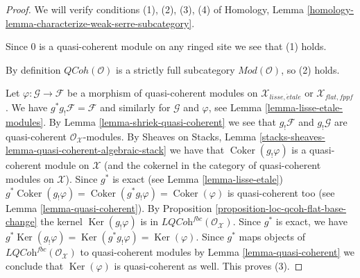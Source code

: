 \documentclass{stacks-project}
\theoremstyle{plain}
\theoremstyle{definition}
\theoremstyle{remark}
\numberwithin{equation}{subsection}
\def\etale{{\acute{e}tale}}
\def\QCoh{\mathit{QCoh}}
\def\Ker{\mathop{\mathrm{Ker}}}
\def\Coker{\mathop{\mathrm{Coker}}}
\begin{document}
\begin{proof}
We will verify conditions (1), (2), (3), (4) of
Homology, Lemma \ref{homology-lemma-characterize-weak-serre-subcategory}.

\medskip\noindent
Since $0$ is a quasi-coherent module on any ringed site we see that (1)
holds.

\medskip\noindent
By definition $\QCoh(\mathcal{O})$
is a strictly full subcategory $\textit{Mod}(\mathcal{O})$, so (2) holds.

\medskip\noindent
Let $\varphi : \mathcal{G} \to \mathcal{F}$ be a morphism of quasi-coherent
modules on $\mathcal{X}_{lisse,\etale}$ or $\mathcal{X}_{flat,fppf}$.
We have $g^*g_!\mathcal{F} = \mathcal{F}$ and similarly for
$\mathcal{G}$ and $\varphi$, see Lemma \ref{lemma-lisse-etale-modules}.
By Lemma \ref{lemma-shriek-quasi-coherent}
we see that $g_!\mathcal{F}$ and $g_!\mathcal{G}$ are quasi-coherent
$\mathcal{O}_\mathcal{X}$-modules. By Sheaves on Stacks, Lemma
\ref{stacks-sheaves-lemma-quasi-coherent-algebraic-stack}
we have that $\Coker(g_!\varphi)$ is a quasi-coherent
module on $\mathcal{X}$ (and the cokernel in the category
of quasi-coherent modules on $\mathcal{X}$).
Since $g^*$ is exact (see Lemma \ref{lemma-lisse-etale})
$g^*\Coker(g_!\varphi) = \Coker(g^*g_!\varphi) = \Coker(\varphi)$
is quasi-coherent too (see Lemma \ref{lemma-quasi-coherent}).
By Proposition \ref{proposition-loc-qcoh-flat-base-change}
the kernel $\Ker(g_!\varphi)$ is in
$\textit{LQCoh}^{fbc}(\mathcal{O}_\mathcal{X})$.
Since $g^*$ is exact, we have
$g^*\Ker(g_!\varphi) = \Ker(g^*g_!\varphi) = \Ker(\varphi)$.
Since $g^*$ maps objects of
$\textit{LQCoh}^{fbc}(\mathcal{O}_\mathcal{X})$ to quasi-coherent
modules by Lemma \ref{lemma-quasi-coherent} we conclude that
$\Ker(\varphi)$ is quasi-coherent as well. This proves (3).


\end{proof}
\end{document}
